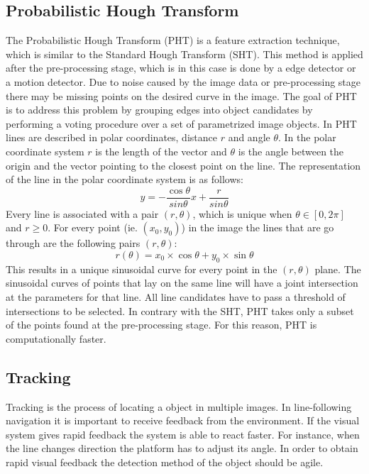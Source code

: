 \documentclass[a4paper]{article}
\begin{document}
\subsection{Probabilistic Hough Transform}
The Probabilistic Hough Transform (PHT) \cite{Kiryati1991} is a feature extraction technique, which is similar to the Standard Hough Transform (SHT). This method is applied after the pre-processing stage, which is in this case is done by a edge detector or a motion detector. Due to noise caused by the image data or pre-processing stage there may be missing points on the desired curve in the image. The goal of PHT is to address this problem by grouping edges into object candidates by performing a voting procedure over a set of parametrized image objects. In PHT lines are described in polar coordinates, distance $r$ and angle $\theta$. In the polar coordinate system $r$ is the length of the vector and $\theta$ is the angle between the origin and the vector pointing to the closest point on the line. The representation of the line in the polar coordinate system is as follows:
\begin{equation}
y = -\frac{\cos \theta}{sin \theta} x + \frac{r}{sin \theta}
\end{equation}
Every line is associated with a pair $(r,\theta)$, which is unique when $\theta \in [0, 2\pi]$ and $r \geq 0$. For every point (ie. $(x_0, y_0)$) in the image the lines that are go through are the following pairs $(r, \theta)$:
\begin{equation}
r(\theta) = x_0 \times \cos \theta + y_0 \times \sin \theta
\end{equation}
This results in a unique sinusoidal curve for every point in the $(r, \theta)$ plane. The sinusoidal curves of points that lay on the same line will have a joint intersection at the parameters for that line. All line candidates have to pass a threshold of intersections to be selected. In contrary with the SHT, PHT takes only a subset of the points found at the pre-processing stage. For this reason, PHT is computationally faster.

\subsection{Tracking}
Tracking is the process of locating a object in multiple images. In line-following navigation it is important to receive feedback from the environment. If the visual system gives rapid feedback the system is able to react faster. For instance, when the line changes direction the platform has to adjust its angle. In order to obtain rapid visual feedback the detection method of the object should be agile.
\end{document}
